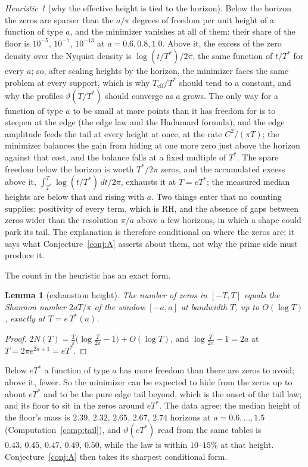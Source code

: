 \documentclass[11pt]{article}
\newtheorem{lemma}[theorem]{Lemma}
\theoremstyle{definition}
\theoremstyle{remark}
\newtheorem{heuristic}[theorem]{Heuristic}
\newcommand{\Tst}{T^{*}}
\begin{document}
\begin{heuristic}[why the effective height is tied to the horizon]\label{heur:why}
Below the horizon the zeros are sparser than the $a/\pi$ degrees of freedom per unit height of a function of type $a$, and the minimizer vanishes at all of them: their share of the floor is $10^{-5}$, $10^{-7}$, $10^{-13}$ at $a=0.6,0.8,1.0$. Above it, the excess of the zero density over the Nyquist density is $\log(t/\Tst)/2\pi$, the same function of $t/\Tst$ for every $a$; so, after scaling heights by the horizon, the minimizer faces the same problem at every support, which is why $T_{\mathrm{eff}}/\Tst$ should tend to a constant, and why the profiles $\vartheta(T/\Tst)$ should converge as $a$ grows. The only way for a function of type $a$ to be small at more points than it has freedom for is to steepen at the edge (the edge law and the Hadamard formula), and the edge amplitude feeds the tail at every height at once, at the rate $C^2/(\pi T)$; the minimizer balances the gain from hiding at one more zero just above the horizon against that cost, and the balance falls at a fixed multiple of $\Tst$. The spare freedom below the horizon is worth $\Tst/2\pi$ zeros, and the accumulated excess above it, $\int_{\Tst}^T\log(t/\Tst)\,dt/2\pi$, exhausts it at $T=e\Tst$; the measured median heights are below that and rising with $a$. Two things enter that no counting supplies: positivity of every term, which is RH, and the absence of gaps between zeros wider than the resolution $\pi/a$ above a few horizons, in which a shape could park its tail. The explanation is therefore conditional on where the zeros are; it says what Conjecture~\ref{conj:A} asserts about them, not why the prime side must produce it.
\end{heuristic}

The count in the heuristic has an exact form.

\begin{lemma}[exhaustion height]\label{lem:exhaust}
The number of zeros in $[-T,T]$ equals the Shannon number $2aT/\pi$ of the window $[-a,a]$ at bandwidth $T$, up to $O(\log T)$, exactly at $T=e\,\Tst(a)$.
\end{lemma}
\begin{proof}
$2N(T)=\frac T\pi\big(\log\frac T{2\pi}-1\big)+O(\log T)$, and $\log\frac T{2\pi}-1=2a$ at $T=2\pi e^{2a+1}=e\Tst$.
\end{proof}

Below $e\Tst$ a function of type $a$ has more freedom than there are zeros to avoid; above it, fewer. So the minimizer can be expected to hide from the zeros up to about $e\Tst$ and to be the pure edge tail beyond, which is the onset of the tail law; and its floor to sit in the zeros around $e\Tst$. The data agree: the median height of the floor's mass is $2.39,\,2.32,\,2.65,\,2.67,\,2.74$ horizons at $a=0.6,\dots,1.5$ (Computation~\ref{comp:tail}), and $\vartheta(e\Tst)$ read from the same tables is $0.43,\,0.45,\,0.47,\,0.49,\,0.50$, while the law is within $10$--$15\%$ at that height. Conjecture~\ref{conj:A} then takes its sharpest conditional form.
\end{document}
